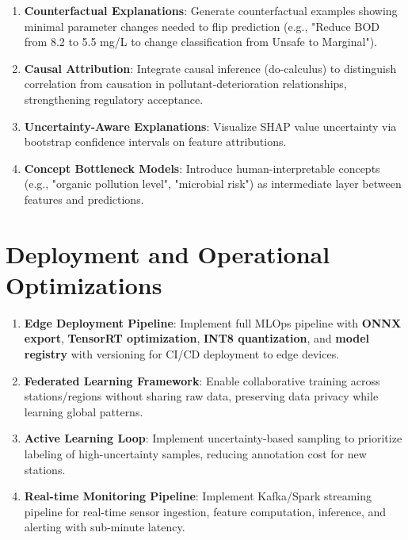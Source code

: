 \documentclass[12pt,a4paper]{report}
\numberwithin{table}{chapter}
\numberwithin{figure}{chapter}
\begin{document}
\begin{enumerate}[leftmargin=1.5cm,itemsep=0pt,topsep=2pt,parsep=0pt,partopsep=0pt]
  \item \textbf{Counterfactual Explanations}: Generate counterfactual examples showing
    minimal parameter changes needed to flip prediction (e.g., "Reduce BOD from 8.2 to
    5.5 mg/L to change classification from Unsafe to Marginal").

  \item \textbf{Causal Attribution}: Integrate causal inference (do-calculus) to
    distinguish correlation from causation in pollutant-deterioration relationships,
    strengthening regulatory acceptance.

  \item \textbf{Uncertainty-Aware Explanations}: Visualize SHAP value uncertainty via
    bootstrap confidence intervals on feature attributions.

  \item \textbf{Concept Bottleneck Models}: Introduce human-interpretable concepts
    (e.g., "organic pollution level", "microbial risk") as intermediate layer between
    features and predictions.
\end{enumerate}

\section{Deployment and Operational Optimizations}

\begin{enumerate}[leftmargin=1.5cm,itemsep=0pt,topsep=0pt,parsep=0pt]
  \item \textbf{Edge Deployment Pipeline}: Implement full MLOps pipeline with
    \textbf{ONNX export}, \textbf{TensorRT optimization}, \textbf{INT8 quantization},
    and \textbf{model registry} with versioning for CI/CD deployment to edge devices.

  \item \textbf{Federated Learning Framework}: Enable collaborative training across
    stations/regions without sharing raw data, preserving data privacy while learning
    global patterns.

  \item \textbf{Active Learning Loop}: Implement uncertainty-based sampling to prioritize
    labeling of high-uncertainty samples, reducing annotation cost for new stations.

  \item \textbf{Real-time Monitoring Pipeline}: Implement Kafka/Spark streaming pipeline
    for real-time sensor ingestion, feature computation, inference, and alerting with
    sub-minute latency.
\end{enumerate}
\end{document}
